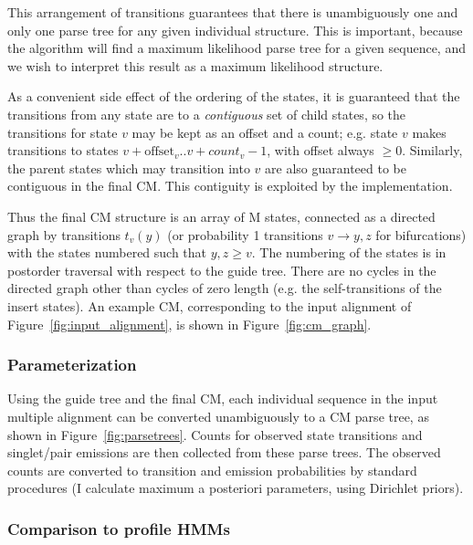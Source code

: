 \documentclass[11pt]{article}
\begin{document}
This arrangement of transitions guarantees that there is unambiguously
one and only one parse tree for any given individual structure. This
is important, because the algorithm will find a maximum likelihood
parse tree for a given sequence, and we wish to interpret this result
as a maximum likelihood structure.

As a convenient side effect of the ordering of the states, it is
guaranteed that the transitions from any state are to a
\emph{contiguous} set of child states, so the transitions for state
$v$ may be kept as an offset and a count; e.g. state $v$ makes
transitions to states $v+\mbox{offset}_v..v+{count}_v-1$, with offset
always $\geq 0$.  Similarly, the parent states which may transition
into $v$ are also guaranteed to be contiguous in the final CM. This
contiguity is exploited by the implementation.

Thus the final CM structure is an array of M states, connected as a
directed graph by transitions $t_v(y)$ (or probability 1 transitions
$v \rightarrow y,z$ for bifurcations) with the states numbered such
that $y,z \geq v$. The numbering of the states is in postorder
traversal with respect to the guide tree. There are no cycles in the
directed graph other than cycles of zero length (e.g. the
self-transitions of the insert states). An example CM, corresponding
to the input alignment of Figure~\ref{fig:input_alignment}, is shown
in Figure~\ref{fig:cm_graph}.

\subsubsection{Parameterization}

Using the guide tree and the final CM, each individual sequence in the
input multiple alignment can be converted unambiguously to a CM parse
tree, as shown in Figure~\ref{fig:parsetrees}. Counts for observed
state transitions and singlet/pair emissions are then collected from
these parse trees. The observed counts are converted to transition and
emission probabilities by standard procedures (I calculate maximum a
posteriori parameters, using Dirichlet priors).

\subsubsection{Comparison to profile HMMs}
\end{document}
